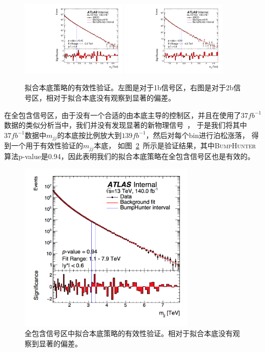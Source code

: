 \begin{figure}[!ht]
	\centering
	\includegraphics[width=0.45\textwidth]{figuresDijet/04-BackgroundEstimation/figure1_mbj.pdf}
	\includegraphics[width=0.45\textwidth]{figuresDijet/04-BackgroundEstimation/figure1_mbb.pdf}
	\caption{拟合本底策略的有效性验证。左图是对于1b信号区，右图是对于2b信号区，相对于拟合本底没有观察到显著的偏差。}
	\label{fig:ABCDmbb}
\end{figure}



在全包含信号区，由于没有一个合适的由本底主导的控制区，并且在使用了37$fb^{-1}$数据的类似分析当中，我们并没有发现显著的新物理信号~\cite{EXOT-2016-21}，
于是我们将其中$37fb^{-1}$数据中$m_{jj}$的本底按比例放大到$139fb^{-1}$，然后对每个bin进行泊松涨落，
得到一个用于有效性验证的$m_{jj}$本底，
如图~\ref{fig:BH_stdPlot}~所示是验证结果，其中\textsc{BumpHunter}算法p-value是0.94，因此表明我们的拟合本底策略在全包含信号区也是有效的。

\begin{figure}[!ht]
        \centering
                \includegraphics[width=0.75\textwidth]{figuresDijet/Appendix-BH/plain.png}
        \caption{全包含信号区中拟合本底策略的有效性验证。相对于拟合本底没有观察到显著的偏差。}
        \label{fig:BH_stdPlot}
\end{figure}


